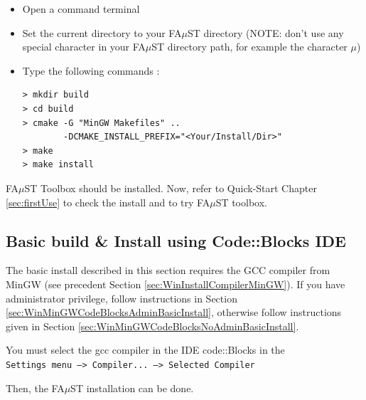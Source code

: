 \begin{itemize}
\item Open a command terminal
\item Set the current directory to your FA$\mu$ST directory (NOTE: don't use any special character in your FA$\mu$ST directory path, for example the character $\mu$)
\item Type the following commands : 
\begin{lstlisting}
> mkdir build
> cd build
> cmake -G "MinGW Makefiles" .. 
	    -DCMAKE_INSTALL_PREFIX="<Your/Install/Dir>"
> make
> make install 
\end{lstlisting}
\end{itemize}
FA$\mu$ST Toolbox should be installed. Now, refer to Quick-Start Chapter \ref{sec:firstUse} to check the install and to try FA$\mu$ST toolbox.

\subsection{Basic build \& Install using Code::Blocks IDE}
\label{sec:WinCodeBlocksBasicInstall}

The basic install described in this section requires the GCC compiler from MinGW (see precedent Section \ref{sec:WinInstallCompilerMinGW}).
If you have administrator privilege, follow instructions in Section \ref{sec:WinMinGWCodeBlocksAdminBasicInstall}, otherwise follow instructions given in Section \ref{sec:WinMinGWCodeBlocksNoAdminBasicInstall}.

You must select the gcc compiler in the IDE code::Blocks in the \\ \texttt{Settings menu --> Compiler... --> Selected Compiler }  

Then, the FA$\mu$ST installation can be done. 

